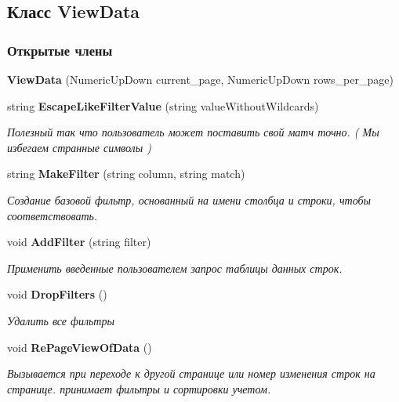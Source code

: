 \subsection{Класс View\+Data}
\label{classkdz__manager_1_1_view_data}
\subsubsection*{Открытые члены}
\begin{DoxyCompactItemize}
\item 
{\bfseries View\+Data} (Numeric\+Up\+Down current\+\_\+page, Numeric\+Up\+Down rows\+\_\+per\+\_\+page)\label{classkdz__manager_1_1_view_data_ae1a1da13bff2e5d8259d85c70dae2942}

\item 
string {\bf Escape\+Like\+Filter\+Value} (string value\+Without\+Wildcards)
\begin{DoxyCompactList}\small\item\em Полезный так что пользователь может поставить свой матч точно. ( Мы избегаем странные символы ) \end{DoxyCompactList}\item 
string {\bf Make\+Filter} (string column, string match)
\begin{DoxyCompactList}\small\item\em Создание базовой фильтр, основанный на имени столбца и строки, чтобы соответствовать. \end{DoxyCompactList}\item 
void {\bf Add\+Filter} (string filter)
\begin{DoxyCompactList}\small\item\em Применить введенные пользователем запрос таблицы данных строк. \end{DoxyCompactList}\item 
void {\bf Drop\+Filters} ()
\begin{DoxyCompactList}\small\item\em Удалить все фильтры \end{DoxyCompactList}\item 
void {\bf Re\+Page\+View\+Of\+Data} ()
\begin{DoxyCompactList}\small\item\em Вызывается при переходе к другой странице или номер изменения строк на странице. принимает фильтры и сортировки учетом. \end{DoxyCompactList}\end{DoxyCompactItemize}
